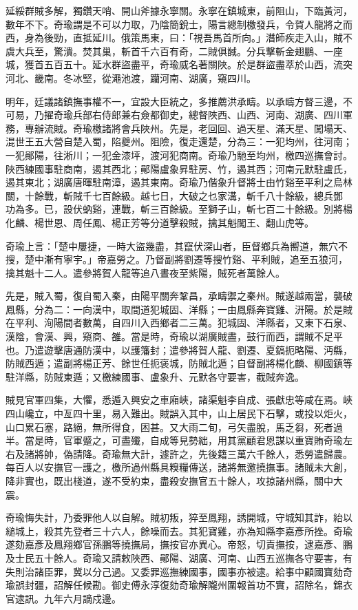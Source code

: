\begin{pinyinscope}
延綏群賊多解，獨鑽天哨、開山斧據永寧關。永寧在鎮城東，前阻山，下臨黃河，數年不下。奇瑜謂是不可以力取，乃陰簡銳士，陽言總制檄發兵，令賀人龍將之而西，身為後勁，直抵延川。俄策馬東，曰：「視吾馬首所向。」潛師疾走入山，賊不虞大兵至，驚潰。焚其巢，斬首千六百有奇，二賊俱馘。分兵擊斬金翅鵬、一座城，獲首五百五十。延水群盜盡平，奇瑜威名著關陜。於是群盜盡萃於山西，流突河北、畿南。冬冰堅，從澠池渡，躪河南、湖廣，窺四川。

明年，廷議諸鎮撫事權不一，宜設大臣統之，多推薦洪承疇。以承疇方督三邊，不可易，乃擢奇瑜兵部右侍郎兼右僉都御史，總督陜西、山西、河南、湖廣、四川軍務，專辦流賊。奇瑜檄諸將會兵陜州。先是，老回回、過天星、滿天星、闖塌天、混世王五大營自楚入蜀，陷夔州。阻險，復走還楚，分為三：一犯均州，往河南；一犯鄖陽，往淅川；一犯金漆坪，渡河犯商南。奇瑜乃馳至均州，檄四巡撫會討。陜西練國事駐商南，遏其西北；鄖陽盧象昇駐房、竹，遏其西；河南元默駐盧氏，遏其東北；湖廣唐暉駐南漳，遏其東南。奇瑜乃偕象升督將士由竹谿至平利之烏林關，十餘戰，斬賊千七百餘級。越七日，大破之乜家溝，斬千八十餘級，總兵鄧功為多。已，設伏蚋谿，連戰，斬三百餘級。至獅子山，斬七百二十餘級。別將楊化麟、楊世恩、周任鳳、楊正芳等分道擊殺賊，擒其魁闖王、翻山虎等。

奇瑜上言：「楚中屢捷，一時大盜幾盡，其竄伏深山者，臣督鄉兵為嚮道，無穴不搜，楚中漸有寧宇。」帝嘉勞之。乃督副將劉遷等搜竹谿、平利賊，追至五狼河，擒其魁十二人。遣參將賀人龍等追八晝夜至紫陽，賊死者萬餘人。

先是，賊入蜀，復自蜀入秦，由陽平關奔鞏昌，承疇禦之秦州。賊遂越兩當，襲破鳳縣，分為二：一向漢中，取間道犯城固、洋縣；一由鳳縣奔寶雞、汧陽。於是賊在平利、洵陽間者數萬，自四川入西鄉者二三萬。犯城固、洋縣者，又東下石泉、漢陰，會漢、興，窺商、雒。當是時，奇瑜以湖廣賊盡，鼓行而西，謂賊不足平也。乃遣遊擊唐通防漢中，以護籓封；遣參將賀人龍、劉遷、夏鎬扼略陽、沔縣，防賊西遁；遣副將楊正芳、餘世任扼褒城，防賊北遁；自督副將楊化麟、柳國鎮等駐洋縣，防賊東遁；又檄練國事、盧象升、元默各守要害，截賊奔逸。

賊見官軍四集，大懼，悉遁入興安之車廂峽，諸渠魁李自成、張獻忠等咸在焉。峽四山巉立，中亙四十里，易入難出。賊誤入其中，山上居民下石擊，或投以炬火，山口累石塞，路絕，無所得食，困甚。又大雨二旬，弓矢盡脫，馬乏芻，死者過半。當是時，官軍蹙之，可盡殲，自成等見勢絀，用其黨顧君恩謀以重寶賄奇瑜左右及諸將帥，偽請降。奇瑜無大計，遽許之，先後籍三萬六千餘人，悉勞遣歸農。每百人以安撫官一護之，檄所過州縣具糗糧傳送，諸將無邀撓撫事。諸賊未大創，降非實也，既出棧道，遂不受約束，盡殺安撫官五十餘人，攻掠諸州縣，關中大震。

奇瑜悔失計，乃委罪他人以自解。賊初叛，猝至鳳翔，誘開城，守城知其詐，紿以縋城上，殺其先登者三十六人，餘噪而去。其犯寶雞，亦為知縣李嘉彥所挫。奇瑜遂劾嘉彥及鳳翔鄉官孫鵬等撓撫局，撫按官亦異心。帝怒，切責撫按，逮嘉彥、鵬及士民五十餘人。奇瑜又請敕陜西、鄖陽、湖廣、河南、山西五巡撫各守要害，有失則治諸臣罪，冀以分己過。又委罪巡撫練國事，國事亦被逮。給事中顧國寶劾奇瑜誤封疆，詔解任候勘。御史傅永淳復劾奇瑜解隴州圍報首功不實，詔除名，錦衣官逮訊。九年六月謫戍邊。


\end{pinyinscope}

